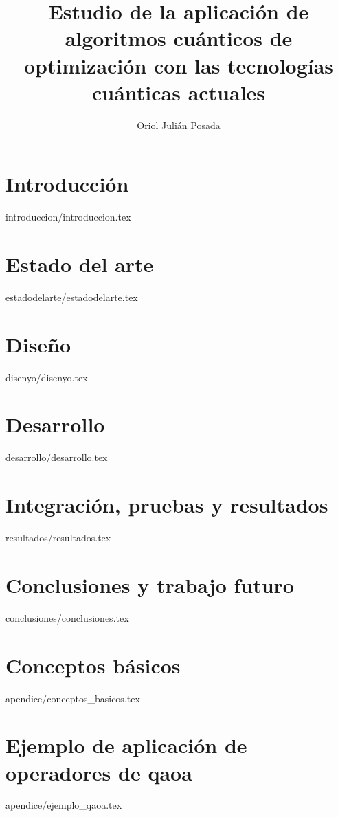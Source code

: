 \documentclass[epsbased,copyleft,final,printable,covers,extendedindex,firstnumbered,tfg,lof,lot]{tfgtfmthesisuam}
\title[Aplicación de algoritmos cuánticos de optimización con las tecnologías cuánticas actuales]{Estudio de la aplicación de algoritmos cuánticos de optimización con las tecnologías cuánticas actuales}
\author{Oriol Julián Posada}
\begin{document}
\chapter{Introducción\label{cap:introduccion}}{introduccion/introduccion.tex}

\chapter{Estado del arte\label{CAP:ESTADODELARTE}}{estadodelarte/estadodelarte.tex}

\chapter{Diseño\label{CAP:DISEÑO}}{disenyo/disenyo.tex}

\chapter{Desarrollo\label{CAP:DESARROLLO}}{desarrollo/desarrollo.tex}

\chapter{Integración, pruebas y resultados\label{CAP:RESULTADOS}}{resultados/resultados.tex}

\chapter{Conclusiones y trabajo futuro\label{CAP:CONCLUSIONES}}{conclusiones/conclusiones.tex}



\newpage
{}




\appendix

\chapter{Conceptos básicos}{apendice/conceptos_basicos.tex}
\chapter{Ejemplo de aplicación de operadores de qaoa\label{CAP:EJEMPLO_QAOA}}{apendice/ejemplo_qaoa.tex}
\end{document}

